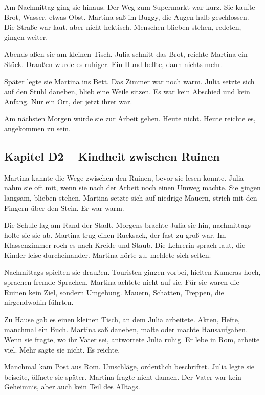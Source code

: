 \documentclass[
]{article}
\begin{document}
Am Nachmittag ging sie hinaus. Der Weg zum Supermarkt war kurz. Sie kaufte Brot, Wasser, etwas Obst. Martina saß im Buggy, die Augen halb geschlossen. Die Straße war laut, aber nicht hektisch. Menschen blieben stehen, redeten, gingen weiter.

Abends aßen sie am kleinen Tisch. Julia schnitt das Brot, reichte Martina ein Stück. Draußen wurde es ruhiger. Ein Hund bellte, dann nichts mehr.

Später legte sie Martina ins Bett. Das Zimmer war noch warm. Julia setzte sich auf den Stuhl daneben, blieb eine Weile sitzen. Es war kein Abschied und kein Anfang. Nur ein Ort, der jetzt ihrer war.

Am nächsten Morgen würde sie zur Arbeit gehen. Heute nicht. Heute reichte es, angekommen zu sein.

\subsection{Kapitel D2 -- Kindheit zwischen Ruinen}\label{kapitel-d2-kindheit-zwischen-ruinen}

Martina kannte die Wege zwischen den Ruinen, bevor sie lesen konnte. Julia nahm sie oft mit, wenn sie nach der Arbeit noch einen Umweg machte. Sie gingen langsam, blieben stehen. Martina setzte sich auf niedrige Mauern, strich mit den Fingern über den Stein. Er war warm.

Die Schule lag am Rand der Stadt. Morgens brachte Julia sie hin, nachmittags holte sie sie ab. Martina trug einen Rucksack, der fast zu groß war. Im Klassenzimmer roch es nach Kreide und Staub. Die Lehrerin sprach laut, die Kinder leise durcheinander. Martina hörte zu, meldete sich selten.

Nachmittags spielten sie draußen. Touristen gingen vorbei, hielten Kameras hoch, sprachen fremde Sprachen. Martina achtete nicht auf sie. Für sie waren die Ruinen kein Ziel, sondern Umgebung. Mauern, Schatten, Treppen, die nirgendwohin führten.

Zu Hause gab es einen kleinen Tisch, an dem Julia arbeitete. Akten, Hefte, manchmal ein Buch. Martina saß daneben, malte oder machte Hausaufgaben. Wenn sie fragte, wo ihr Vater sei, antwortete Julia ruhig. Er lebe in Rom, arbeite viel. Mehr sagte sie nicht. Es reichte.

Manchmal kam Post aus Rom. Umschläge, ordentlich beschriftet. Julia legte sie beiseite, öffnete sie später. Martina fragte nicht danach. Der Vater war kein Geheimnis, aber auch kein Teil des Alltags.
\end{document}
